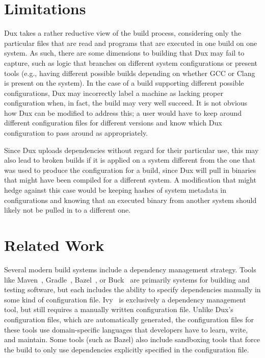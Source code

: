 \documentclass[10pt,conference]{IEEEtran}
\begin{document}
\section{Limitations}

Dux takes a rather reductive view of the build process, considering only the particular files that are read
and programs that are executed in one build on one system. As such, there are some dimensions to building that
Dux may fail to capture, such as logic that branches on different system configurations or present tools (e.g.,
having different possible builds depending on whether GCC or Clang is present on the system). In the case of
a build supporting different possible configurations, Dux may incorrectly label a machine as lacking proper
configuration when, in fact, the build may very well succeed. It is not obvious how Dux can be modified to address
this; a user would have to keep around different configuration files for different versions and know which
Dux configuration to pass around as appropriately.

Since Dux uploads dependencies without regard for their particular use, this may also lead to broken builds 
if it is applied on a system different from the one that was used to produce the configuration for a build, 
since Dux will pull in binaries that might have been compiled for a different system. A modification that
might hedge against this case would be keeping hashes of system metadata in configurations and knowing
that an executed binary from another system should likely not be pulled in to a different one.

\section{Related Work}

Several modern build systems include a dependency management strategy. Tools like
Maven~\cite{Maven}, Gradle~\cite{Gradle}, Bazel~\cite{blaze}, or Buck~\cite{buck}
are primarily systems for building and testing software, but each includes the
ability to specify dependencies manually in some kind of configuration file.
Ivy~\cite{Ivy} is exclusively a dependency management tool, but still requires
a manually written configuration file.
Unlike Dux's configuration files, which are automatically generated, the configuration
files for these tools use domain-specific languages that developers have to learn,
write, and maintain. Some tools (such as Bazel) also include sandboxing tools
that force the build to only use dependencies explicitly specified in the
configuration file.
\end{document}
